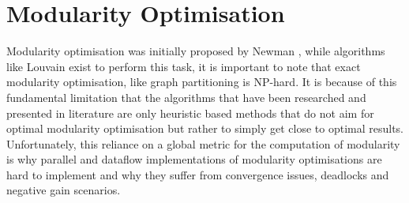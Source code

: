 
\section{Modularity Optimisation}
Modularity optimisation was initially proposed by Newman \cite{newman2004findingeval}, while algorithms like Louvain \cite{blondel2008fast} exist to perform this task, it is important to note that exact modularity optimisation, like graph partitioning is NP-hard. It is because of this fundamental limitation that the algorithms that have been researched and presented in literature are only heuristic based methods that do not aim for optimal modularity optimisation but rather to simply get close to optimal results. Unfortunately, this reliance on a global metric for the computation of modularity is why parallel and dataflow implementations of modularity optimisations are hard to implement and why they suffer from convergence issues, deadlocks and negative gain scenarios. 

